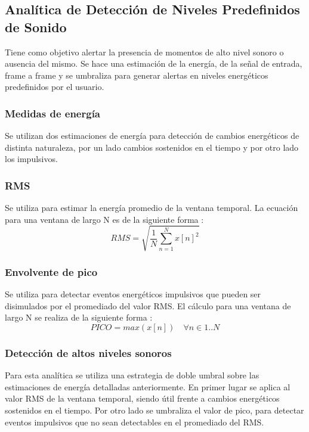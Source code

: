 \documentclass{article}
\begin{document}
\subsection{Analítica de Detección de Niveles Predefinidos de Sonido}
Tiene como objetivo alertar la presencia de momentos de alto nivel sonoro o ausencia del mismo. Se hace una estimación de la energía, de la señal de entrada, frame a frame y se umbraliza para generar alertas en niveles energéticos predefinidos por el usuario.

\subsubsection{Medidas de energía}
Se utilizan dos estimaciones de energía para detección de cambios energéticos de distinta naturaleza, por un lado cambios sostenidos en el tiempo y por otro lado los impulsivos.

\subsubsection*{RMS}
Se utiliza para estimar la energía promedio de la ventana temporal. La ecuación para una ventana de largo N es de la siguiente forma \cite[Chapter~4]{Lerch:2012:IAC:2392638}:
\begin{equation}
RMS = \sqrt{\frac{1}{N}\sum_{n=1}^{N} x[n]^2}
\end{equation}

\subsubsection*{Envolvente de pico}
Se utiliza para detectar eventos energéticos impulsivos que pueden ser disimulados por el promediado del valor RMS. El cálculo para una ventana de largo N se realiza de la siguiente forma \cite[Chapter~4]{Lerch:2012:IAC:2392638}:
\begin{equation}
PICO = max(x[n]) \quad \forall n \in 1..N 
\end{equation}

\subsubsection{Detección de altos niveles sonoros}
Para esta analítica se utiliza una estrategia de doble umbral sobre las estimaciones de energía detalladas anteriormente. En primer lugar se aplica al valor RMS de la ventana temporal, siendo útil frente a cambios energéticos sostenidos en el tiempo. Por otro lado se umbraliza el valor de pico, para detectar eventos impulsivos que no sean detectables en el promediado del RMS.
\end{document}
